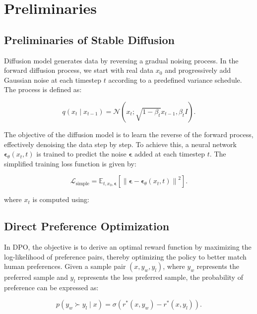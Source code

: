 \section{Preliminaries}

\subsection{Preliminaries of Stable Diffusion}

Diffusion model generates data by reversing a gradual noising process. In the forward diffusion process, we start with real data $x_0$ and progressively add Gaussian noise at each timestep $t$ according to a predefined variance schedule. The process is defined as:

\begin{equation}
q(x_t \mid x_{t-1}) = \mathcal{N}\left( x_t; \sqrt{1 - \beta_t} x_{t-1}, \beta_t I \right).
\end{equation}

The objective of the diffusion model is to learn the reverse of the forward process, effectively denoising the data step by step. To achieve this, a neural network $\boldsymbol{\epsilon}_\theta(x_t, t)$ is trained to predict the noise $\boldsymbol{\epsilon}$ added at each timestep $t$. The simplified training loss function is given by:

\begin{equation}
\mathcal{L}_{\text{simple}} = \mathbb{E}_{t, x_0, \boldsymbol{\epsilon}} \left[ \left\| \boldsymbol{\epsilon} - \boldsymbol{\epsilon}_\theta\left( x_t, t \right) \right\|^2 \right].
\label{lab:1}
\end{equation}

where $x_t$ is computed using:

\subsection{Direct Preference Optimization}

In DPO, the objective is to derive an optimal reward function by maximizing the log-likelihood of preference pairs, thereby optimizing the policy to better match human preferences. Given a sample pair $(x, y_w, y_l)$, where $y_w$ represents the preferred sample and $y_l$ represents the less preferred sample, the probability of preference can be expressed as:

\begin{equation}
p(y_w \succ y_l \mid x) = \sigma(r^*(x, y_w) - r^*(x, y_l)).
\end{equation}

